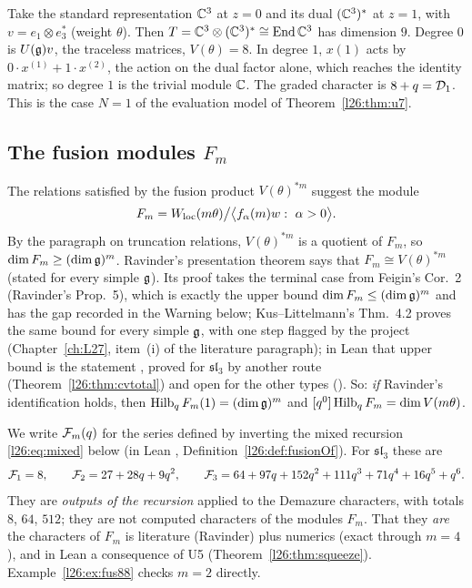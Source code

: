 \begin{example}\label{l26:ex:eval1}
Take the standard representation ${\mathbb{C}}^3$ at $z=0$ and its dual $({\mathbb{C}}^3)^*$ at $z=1$, with $v=e_1\otimes e_3^*$ (weight $\theta$).
Then $T={\mathbb{C}}^3\otimes({\mathbb{C}}^3)^*\cong\operatorname{End}{\mathbb{C}}^3$ has dimension $9$. Degree $0$ is $U(\mathfrak g)v$, the traceless
matrices, $V(\theta)=8$. In degree $1$, $x(1)$ acts by $0\cdot x^{(1)}+1\cdot x^{(2)}$, the action on the dual factor alone, which
reaches the identity matrix; so degree $1$ is the trivial module ${\mathbb{C}}$. The graded character is $8+q=\mathcal D_1$. This is the
case $N=1$ of the evaluation model of Theorem~\ref{l26:thm:u7}.
\end{example}

\subsection{The fusion modules $F_m$}

The relations satisfied by the fusion product $V(\theta)^{*m}$ suggest the module
\begin{equation}\label{l26:eq:Fm}
F_m=\ltwentysixWloc(m\theta)\big/\bigl\langle f_\alpha(m)w:\ \alpha>0\bigr\rangle .
\end{equation}
By the paragraph on truncation relations, $V(\theta)^{*m}$ is a quotient of $F_m$, so $\dim F_m\ge(\dim\mathfrak g)^m$.
Ravinder's presentation theorem says that $F_m\cong V(\theta)^{*m}$ (stated for every simple $\mathfrak g$). Its proof takes the
terminal case from Feigin's Cor.~2 (Ravinder's Prop.~5), which is exactly the upper bound $\dim F_m\le(\dim\mathfrak g)^m$ and has
the gap recorded in the Warning below; Kus--Littelmann's Thm.~4.2 proves the same bound for every simple $\mathfrak g$, with one
step flagged by the project (Chapter~\ref{ch:L27}, item~(i) of the literature paragraph); in Lean that upper bound is the statement , proved for $\mathfrak{sl}_3$
by another route (Theorem~\ref{l26:thm:cvtotal}) and open for the other types (). So: \emph{if} Ravinder's identification holds, then $\operatorname{Hilb}_qF_m(1)=(\dim\mathfrak g)^m$ and
$[q^0]\operatorname{Hilb}_qF_m=\dim V(m\theta)$.

We write $\mathcal F_m(q)$ for the series defined by inverting the mixed recursion \eqref{l26:eq:mixed} below (in Lean
, Definition~\ref{l26:def:fusionOf}). For $\mathfrak{sl}_3$ these are
\begin{equation*}
\mathcal F_1=8,\qquad \mathcal F_2=27+28q+9q^2,\qquad \mathcal F_3=64+97q+152q^2+111q^3+71q^4+16q^5+q^6 .
\end{equation*}
They are \emph{outputs of the recursion} applied to the Demazure characters, with totals $8$, $64$, $512$; they are not computed
characters of the modules $F_m$. That they \emph{are} the characters of $F_m$ is literature (Ravinder) plus numerics (exact through
$m=4$), and in Lean a consequence of U5 (Theorem~\ref{l26:thm:squeeze}). Example~\ref{l26:ex:fus88} checks $m=2$ directly.


